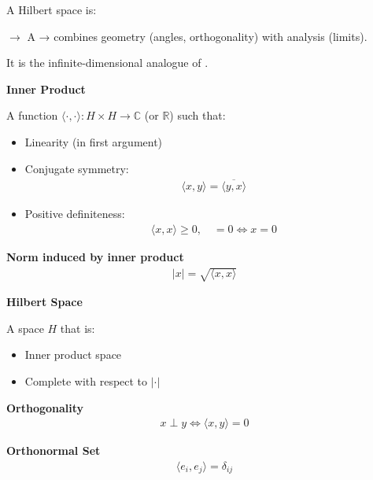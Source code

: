 \documentclass[12pt,a4paper]{report}
\begin{document}
\begin{description}
\item {}

A Hilbert space is:

$\to$ A  → combines geometry (angles, orthogonality) with analysis (limits).

It is the infinite-dimensional analogue of .

\item {}

\begin{description}
    \item \textbf{Inner Product}

A function $ \langle \cdot,\cdot \rangle : H \times H \to \mathbb{C} $ (or $\mathbb{R}$) such that:

\begin{itemize}
\item Linearity (in first argument)
\item Conjugate symmetry:
  \begin{align*}
  \langle x,y\rangle = \overline{\langle y,x\rangle}
  \end{align*}
\item Positive definiteness:
  \begin{align*}
  \langle x,x\rangle \ge 0,\quad =0 \iff x=0
  \end{align*}
\end{itemize}

    \item \textbf{Norm induced by inner product}
\begin{align*}
|x| = \sqrt{\langle x,x\rangle}
\end{align*}

    \item \textbf{Hilbert Space}

A space $H$ that is:
\begin{itemize}
\item Inner product space
\item Complete with respect to $|\cdot|$
\end{itemize}

    \item \textbf{Orthogonality}
\begin{align*}
x \perp y \iff \langle x,y\rangle = 0
\end{align*}

    \item \textbf{Orthonormal Set}
\begin{align*}
\langle e_i, e_j\rangle = \delta_{ij}
\end{align*}
\end{description}


\end{description}
\end{document}
